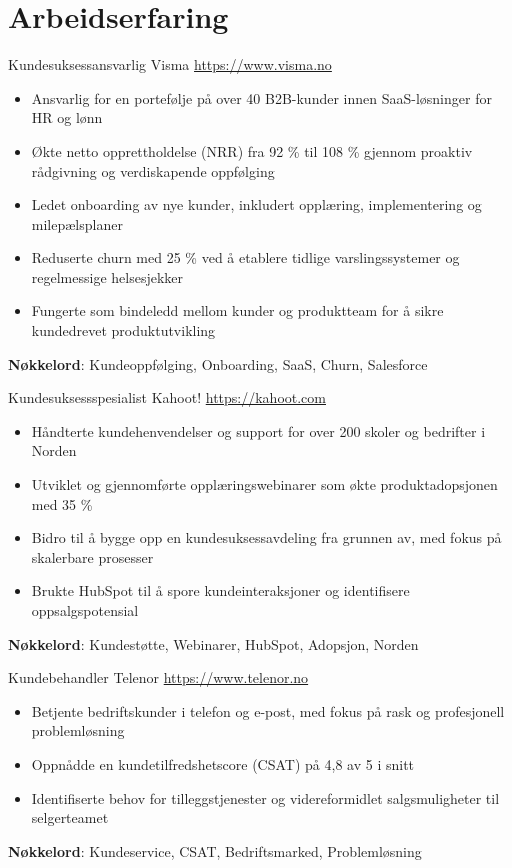 \documentclass[a4paper, serif, 10pt]{moderncv}
\begin{document}
\section{Arbeidserfaring}

        {Kundesuksessansvarlig}
        {Visma}
        {\url{https://www.visma.no}}
        {}
        {\begin{itemize}
\item Ansvarlig for en portefølje på over 40 B2B-kunder innen SaaS-løsninger for HR og lønn
\item Økte netto opprettholdelse (NRR) fra 92 \% til 108 \% gjennom proaktiv rådgivning og verdiskapende oppfølging
\item Ledet onboarding av nye kunder, inkludert opplæring, implementering og milepælsplaner
\item Reduserte churn med 25 \% ved å etablere tidlige varslingssystemer og regelmessige helsesjekker
\item Fungerte som bindeledd mellom kunder og produktteam for å sikre kundedrevet produktutvikling
\end{itemize}
\textbf{Nøkkelord}: Kundeoppfølging, Onboarding, SaaS, Churn, Salesforce}

        {Kundesuksessspesialist}
        {Kahoot!}
        {\url{https://kahoot.com}}
        {}
        {\begin{itemize}
\item Håndterte kundehenvendelser og support for over 200 skoler og bedrifter i Norden
\item Utviklet og gjennomførte opplæringswebinarer som økte produktadopsjonen med 35 \%
\item Bidro til å bygge opp en kundesuksessavdeling fra grunnen av, med fokus på skalerbare prosesser
\item Brukte HubSpot til å spore kundeinteraksjoner og identifisere oppsalgspotensial
\end{itemize}
\textbf{Nøkkelord}: Kundestøtte, Webinarer, HubSpot, Adopsjon, Norden}

        {Kundebehandler}
        {Telenor}
        {\url{https://www.telenor.no}}
        {}
        {\begin{itemize}
\item Betjente bedriftskunder i telefon og e-post, med fokus på rask og profesjonell problemløsning
\item Oppnådde en kundetilfredshetscore (CSAT) på 4,8 av 5 i snitt
\item Identifiserte behov for tilleggstjenester og videreformidlet salgsmuligheter til selgerteamet
\end{itemize}
\textbf{Nøkkelord}: Kundeservice, CSAT, Bedriftsmarked, Problemløsning}
\end{document}
